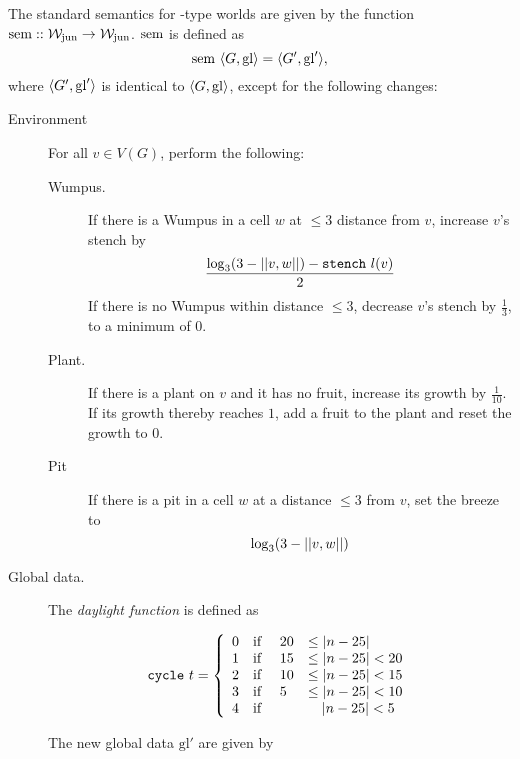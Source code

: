 \begin{definition}
\label{def:ssem}
The standard semantics for \wjun-type worlds are given by the function $\mathrm{sem} :: \mathtt{\mathcal{W}_{\mathrm{jun}} \rightarrow \mathcal{W}_{\mathrm{jun}}}$. $\mathrm{sem}$ is defined as 
$$\mathrm{sem}\ \langle G, \mathrm{gl} \rangle = \langle G', \mathrm{gl}' \rangle, $$
where $\langle G', \mathrm{gl}' \rangle$ is identical to $\langle G, \mathrm{gl} \rangle$, except for the following changes:

\begin{description}
	\item[Environment] For all $v \in V(G)$, perform the following:
	
	\begin{description}
		\item[Wumpus.] If there is a Wumpus in a cell $w$ at $\leq 3$ distance from $v$, increase $v$'s stench by
		$$
			\frac{
				\log_{3}(3 - ||{v},{w}||) - \mathtt{stench}\ l(v)
			}{2}
		$$
		If there is no Wumpus within distance $\leq 3$, decrease $v$'s stench by $\frac{1}{3}$, to a minimum of 0.
		
		\item[Plant.] If there is a plant on $v$ and it has no fruit, increase its growth by $\frac{1}{10}$. If its growth thereby reaches $1$, add a fruit to the plant and reset the growth to 0.
		
		\item[Pit] If there is a pit in a cell $w$ at a distance $\leq 3$ from $v$, set the breeze to
 		$$
			\log_{3}(3 - ||{v},{w}||)
		$$
	\end{description}
	
	\item[Global data.] The {\em daylight function} is defined as
	
	$$
			\mathtt{cycle}\ t = 
			\left\{
				\begin{array}{l l l l}
					0 & \textnormal{if } & 20 & \leq |n - 25|\\
					1 & \textnormal{if } & 15 & \leq |n - 25| < 20\\
					2 & \textnormal{if } & 10 & \leq |n - 25| < 15\\
					3 & \textnormal{if } & 5 & \leq |n - 25| < 10\\
					4 & \textnormal{if } & & \ \ \ |n - 25| < 5
				\end{array}
			\right.
	$$
	
	The new global data $\mathrm{gl}'$ are given by
	

\end{description}
\end{definition}
